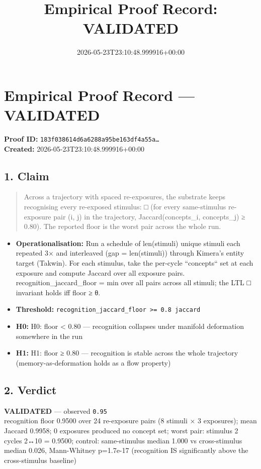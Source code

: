 \documentclass{article}
\title{Empirical Proof Record: VALIDATED}
\date{2026-05-23T23:10:48.999916+00:00}
\begin{document}
\maketitle
\section*{Empirical Proof Record --- \textcolor{validated}{\textbf{VALIDATED}}}
\textbf{Proof ID:} \texttt{183f038614d6a6288a95be163df4a55a\dots}\\
\textbf{Created:} 2026-05-23T23:10:48.999916+00:00
\subsection*{1. Claim}
\begin{quote}Across a trajectory with spaced re-exposures, the substrate keeps recognising every re-exposed stimulus: □ (for every same-stimulus re-exposure pair (i, j) in the trajectory, Jaccard(concepts\_i, concepts\_j) ≥ 0.80). The reported floor is the worst pair across the whole run.\end{quote}
\begin{itemize}
\item \textbf{Operationalisation:} Run a schedule of len(stimuli) unique stimuli each repeated 3× and interleaved (gap = len(stimuli)) through Kimera's entity target (Takwin). For each stimulus, take the per-cycle ``concepts`` set at each exposure and compute Jaccard over all exposure pairs. recognition\_jaccard\_floor = min over all pairs across all stimuli; the LTL □ invariant holds iff floor ≥ θ.
\item \textbf{Threshold:} \texttt{recognition\_jaccard\_floor >= 0.8 jaccard}
\item \textbf{H0:} H0: floor < 0.80 — recognition collapses under manifold deformation somewhere in the run
\item \textbf{H1:} H1: floor ≥ 0.80 — recognition is stable across the whole trajectory (memory-as-deformation holds as a flow property)
\end{itemize}
\subsection*{2. Verdict}
\textcolor{validated}{\textbf{VALIDATED}} --- observed \texttt{0.95}\\
recognition floor 0.9500 over 24 re-exposure pairs (8 stimuli × 3 exposures); mean Jaccard 0.9958; 0 exposures produced no concept set; worst pair: stimulus 2 cycles 2↔10 = 0.9500; control: same-stimulus median 1.000 vs cross-stimulus median 0.026, Mann-Whitney p=1.7e-17 (recognition IS significantly above the cross-stimulus baseline)
\end{document}
